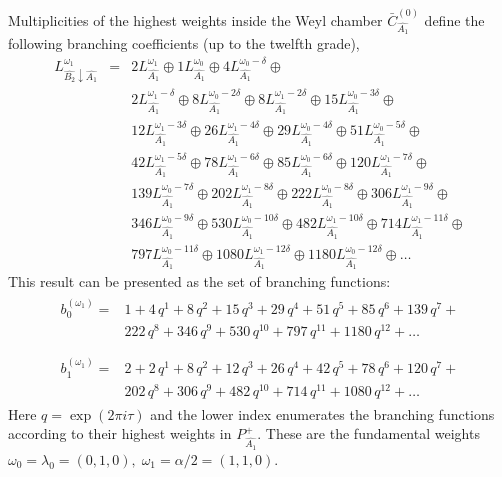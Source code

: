 Multiplicities of the highest weights inside the  Weyl chamber
$\bar{C}^{\left( 0 \right)}_{\hat{A_1}}$
define the following branching coefficients (up to the twelfth grade),
\begin{eqnarray*}
  \label{eq:28}
  L^{\omega_1}_{\hat{B_2}\downarrow \hat{A_1}}
  &=&2 L_{\hat{A_1}}^{\omega_1}\oplus 1 L_{\hat{A_1}}^{\omega_0}\oplus 4 L_{\hat{A_1}}^{\omega_0-\delta}\oplus\\
    &&2 L_{\hat{A_1}}^{\omega_1-\delta}\oplus 8 L_{\hat{A_1}}^{\omega_0-2\delta}\oplus
    8 L_{\hat{A_1}}^{\omega_1-2\delta}\oplus 15 L_{\hat{A_1}}^{\omega_0-3\delta}\oplus\\
    &&12 L_{\hat{A_1}}^{\omega_1-3\delta}\oplus 26 L_{\hat{A_1}}^{\omega_1-4\delta}\oplus
    29 L_{\hat{A_1}}^{\omega_0-4\delta}\oplus 51 L_{\hat{A_1}}^{\omega_0-5\delta}\oplus\\
    &&42 L_{\hat{A_1}}^{\omega_1-5\delta}\oplus 78 L_{\hat{A_1}}^{\omega_1-6\delta}\oplus
    85 L_{\hat{A_1}}^{\omega_0-6\delta}\oplus 120 L_{\hat{A_1}}^{\omega_1-7\delta}\oplus\\
    &&139 L_{\hat{A_1}}^{\omega_0-7\delta}\oplus 202 L_{\hat{A_1}}^{\omega_1-8\delta}\oplus
    222 L_{\hat{A_1}}^{\omega_0-8\delta}\oplus 306 L_{\hat{A_1}}^{\omega_1-9\delta}\oplus\\
    &&346 L_{\hat{A_1}}^{\omega_0-9\delta}\oplus 530 L_{\hat{A_1}}^{\omega_0-10\delta}\oplus
    482 L_{\hat{A_1}}^{\omega_1-10\delta}\oplus 714 L_{\hat{A_1}}^{\omega_1-11\delta}\oplus\\
    &&797 L_{\hat{A_1}}^{\omega_0-11\delta}\oplus 1080 L_{\hat{A_1}}^{\omega_1-12\delta}\oplus
    1180 L_{\hat{A_1}}^{\omega_0-12\delta}\oplus \dots
\end{eqnarray*}
This result can be presented as the set of branching functions:
\begin{eqnarray*}
  \label{eq:29}
  \begin{array}{cc}
    b^{(\omega_1)}_{0}= & 1 + 4\,q^{1}+ 8\,q^{2}+ 15\,q^{3}+ 29\,q^{4}+ 51\,q^{5}+ 85\,q^{6}+ 139\,q^{7}+\\
     &222\,q^{8}+ 346\,q^{9}+ 530\,q^{10}+ 797\,q^{11}+ 1180\,q^{12}+\dots\\
  \end{array}\\
  \begin{array}{cc}
    b^{(\omega_1)}_{1}= &2+2\,q^{1}+8\,q^{2}+12\,q^{3}+26\,q^{4}+42\,q^{5}+78\,q^{6}+120\,q^{7}+\\
    & 202\,q^{8}+306\,q^{9}+482\,q^{10}+714\,q^{11}+1080\,q^{12}+\dots
  \end{array}
\end{eqnarray*}
Here $q=\exp (2\pi i \tau)$ and the lower index enumerates the branching functions according
to their highest weights in $P^+_{\hat{A_1}}$.
These are the fundamental weights $\omega_0=\lambda_0=(0,1,0),\; \omega_1=\alpha/2=(1,1,0)$.

